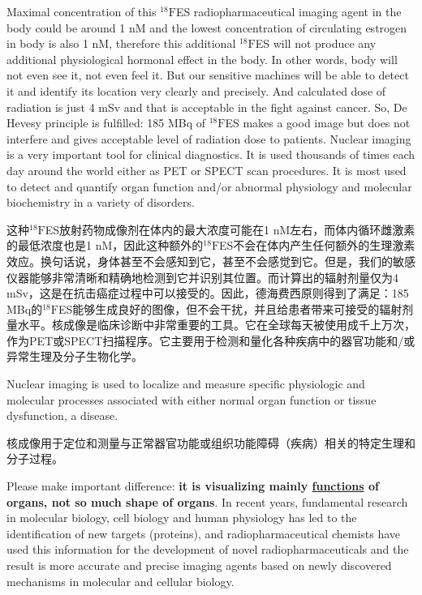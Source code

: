 \documentclass[dvipsnames, svgnames,a4paper,11pt]{article}
\begin{document}
Maximal concentration of this ${}^{18}\text{F}$ES radiopharmaceutical imaging agent in the body could be around 1 nM and the lowest concentration of circulating estrogen in body is also 1 nM, therefore this additional ${}^{18}\text{F}$ES will not produce any additional physiological hormonal effect in the body. In other words, body will not even see it, not even feel it. But our sensitive machines will be able to detect it and identify its location very clearly and precisely. And calculated dose of radiation is just 4 mSv and that is acceptable in the fight against cancer. So, De Hevesy principle is fulfilled: 185 MBq of ${}^{18}\text{F}$ES makes a good image but does not interfere and gives acceptable level of radiation dose to patients. Nuclear imaging is a very important tool for clinical diagnostics. It is used thousands of times each day around the world either as PET or SPECT scan procedures. It is most used to detect and quantify organ function and/or abnormal physiology and molecular biochemistry in a variety of disorders.

这种${}^{18}\text{F}$ES放射药物成像剂在体内的最大浓度可能在1 nM左右，而体内循环雌激素的最低浓度也是1 nM，因此这种额外的${}^{18}\text{F}$ES不会在体内产生任何额外的生理激素效应。换句话说，身体甚至不会感知到它，甚至不会感觉到它。但是，我们的敏感仪器能够非常清晰和精确地检测到它并识别其位置。而计算出的辐射剂量仅为4 mSv，这是在抗击癌症过程中可以接受的。因此，德海费西原则得到了满足：185 MBq的${}^{18}\text{F}$ES能够生成良好的图像，但不会干扰，并且给患者带来可接受的辐射剂量水平。核成像是临床诊断中非常重要的工具。它在全球每天被使用成千上万次，作为PET或SPECT扫描程序。它主要用于检测和量化各种疾病中的器官功能和/或异常生理及分子生物化学。

Nuclear imaging is used to localize and measure specific physiologic and molecular processes associated with either normal organ function or tissue dysfunction, a disease.

核成像用于定位和测量与正常器官功能或组织功能障碍（疾病）相关的特定生理和分子过程。

Please make important difference: \textbf{it is visualizing mainly \underline{functions} of organs, not so much shape of organs}. In recent years, fundamental research in molecular biology, cell biology and human physiology has led to the identification of new targets (proteins), and radiopharmaceutical chemists have used this information for the development of novel radiopharmaceuticals and the result is more accurate and precise imaging agents based on newly discovered mechanisms in molecular and cellular biology.
\end{document}

